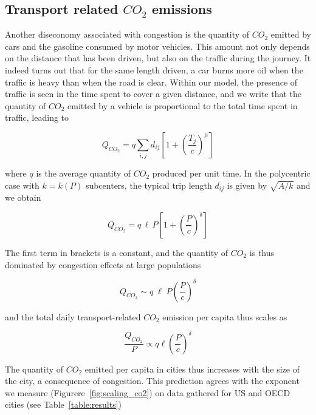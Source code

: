\subsection{Transport related $CO_2$ emissions}

Another diseconomy associated with congestion is the quantity of $CO_2$ emitted
by cars and the gasoline consumed by motor vehicles. This amount not only
depends on the distance that has been driven, but also on the traffic during the
journey. It indeed turns out that for the same length driven, a car burns more
oil when the traffic is heavy than when the road is clear.  Within our model,
the presence of traffic is seen in the time spent to cover a given distance, and
we write that the quantity of $CO_2$ emitted by a vehicle is proportional to the
total time spent in traffic, leading to

\begin{equation}
    Q_{CO_2}  = q \sum_{i,j} d_{ij} \left[ 1+ \left( \frac{T_j}{c} \right)^\mu \right]
\end{equation}

where $q$ is the average quantity of $CO_2$ produced per unit time. In the
polycentric case with $k=k(P)$ subcenters, the typical trip length
$\overline{d_{ij}}$ is given by $\sqrt{A/k}$ and we obtain

\begin{equation}
    Q_{CO_2} = q\, \ell\, P \left[ 1 + \left(\frac{P}{c}\right)^{\delta} \right]
\end{equation}

The first term in brackets is a constant, and the quantity of $CO_2$ is thus
dominated by congestion effects at large populations

\begin{equation}
    Q_{CO_2} \sim q\; \ell\; P \left(\frac{P}{c}\right)^{\delta}
\end{equation}



and the total daily transport-related $CO_2$ emission per capita thus scales as 

\begin{equation}
    \frac{Q_{CO_2}}{P} \propto  q\ell \left(\frac{P}{c}\right)^{\delta}
\end{equation}

The quantity of $CO_2$ emitted per capita in cities thus increases with the size
of the city, a consequence of congestion. This prediction agrees with the
exponent we measure (Figurere~\ref{fig:scaling_co2}) on data gathered for US and OECD cities (see
Table~\ref{table:results})

